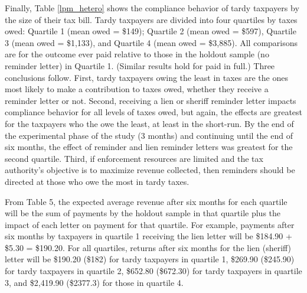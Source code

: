 \documentclass[12pt]{article}
\begin{document}
Finally, Table \ref{lpm_hetero} shows the compliance behavior of tardy
taxpayers by the size of their tax bill.  Tardy taxpayers are divided
into four quartiles by taxes owed: Quartile 1 (mean owed = \$149);
Quartile 2 (mean owed = \$597), Quartile 3 (mean owed = \$1,133), and
Quartile 4 (mean owed = \$3,885).  All comparisons are for the
outcome ever paid relative to those in the holdout sample (no reminder
letter) in Quartile 1. (Similar results hold for paid in full.)  Three
conclusions follow.  First, tardy taxpayers owing the least in taxes
are the ones most likely to make a contribution to taxes owed, whether
they receive a reminder letter or not. Second, receiving a lien or
sheriff reminder letter impacts compliance behavior for all levels of
taxes owed, but again, the effects are greatest for the taxpayers who
the owe the least, at least in the short-run. By the end of the
experimental phase of the study (3 months) and continuing until the
end of six months, the effect of reminder and lien reminder letters
was greatest for the second quartile. Third, if enforcement resources
are limited and the tax authority's objective is to maximize revenue collected,
then reminders should be directed at those who owe the most in tardy taxes.

From Table 5, the expected average revenue after six months for each quartile will be
the sum of payments by the holdout sample in that quartile plus the
impact of each letter on payment for that quartile.  For example,
payments after six months by taxpayers in quartile 1 receiving the
lien letter will be \$184.90 + \$5.30 = \$190.20.  For all quartiles,
returns after six months for the lien (sheriff) letter will be
\$190.20 (\$182) for tardy taxpayers in quartile 1, \$269.90
(\$245.90) for tardy taxpayers in quartile 2, \$652.80 (\$672.30) for
tardy taxpayers in quartile 3, and \$2,419.90 (\$2377.3) for those in
quartile 4.
\end{document}

